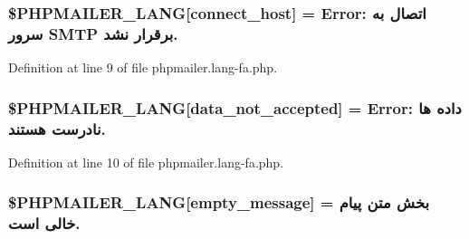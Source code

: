 \subsubsection[{\texorpdfstring{\$\+P\+H\+P\+M\+A\+I\+L\+E\+R\+\_\+\+L\+A\+NG}{$PHPMAILER_LANG}}]{\setlength{\rightskip}{0pt plus 5cm}\$P\+H\+P\+M\+A\+I\+L\+E\+R\+\_\+\+L\+A\+NG\mbox{[}\textquotesingle{}connect\+\_\+host\textquotesingle{}\mbox{]} =  Error\+: اتصال به سرور {\bf S\+M\+TP} برقرار نشد.\textquotesingle{}}\hypertarget{phpmailer_8lang-fa_8php_a2ee0cc637a06b96e45600db31c6799ee}{}\label{phpmailer_8lang-fa_8php_a2ee0cc637a06b96e45600db31c6799ee}


Definition at line 9 of file phpmailer.\+lang-\/fa.\+php.

\subsubsection[{\texorpdfstring{\$\+P\+H\+P\+M\+A\+I\+L\+E\+R\+\_\+\+L\+A\+NG}{$PHPMAILER_LANG}}]{\setlength{\rightskip}{0pt plus 5cm}\$P\+H\+P\+M\+A\+I\+L\+E\+R\+\_\+\+L\+A\+NG\mbox{[}\textquotesingle{}data\+\_\+not\+\_\+accepted\textquotesingle{}\mbox{]} =  Error\+: داده ها نادرست هستند.\textquotesingle{}}\hypertarget{phpmailer_8lang-fa_8php_a814c6b191205d2361b3233e9c9d6fda5}{}\label{phpmailer_8lang-fa_8php_a814c6b191205d2361b3233e9c9d6fda5}


Definition at line 10 of file phpmailer.\+lang-\/fa.\+php.

\subsubsection[{\texorpdfstring{\$\+P\+H\+P\+M\+A\+I\+L\+E\+R\+\_\+\+L\+A\+NG}{$PHPMAILER_LANG}}]{\setlength{\rightskip}{0pt plus 5cm}\$P\+H\+P\+M\+A\+I\+L\+E\+R\+\_\+\+L\+A\+NG\mbox{[}\textquotesingle{}empty\+\_\+message\textquotesingle{}\mbox{]} = \textquotesingle{}بخش متن پیام خالی است.\textquotesingle{}}\hypertarget{phpmailer_8lang-fa_8php_a33772099f637c9d6c2cd7425e0e37fed}{}\label{phpmailer_8lang-fa_8php_a33772099f637c9d6c2cd7425e0e37fed}


